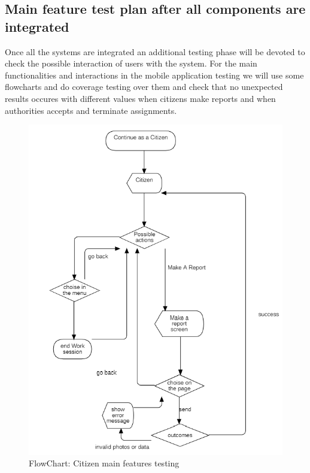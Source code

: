 \subsection{Main feature test plan after all components are integrated}
Once all the systems are integrated an additional testing phase will be devoted to check the possible interaction of users with the system. For the main functionalities and interactions in the mobile application testing we will use some flowcharts and do coverage testing over them and check that no unexpected results occures with different values when citizens make reports and when authorities accepts and terminate assignments.
\begin{figure}[H]
\centering
\includegraphics{Images/FlowChartCitizen.png}
\caption{\label{fig:ComWI}FlowChart: Citizen main features testing}
\end{figure}
\newpage
